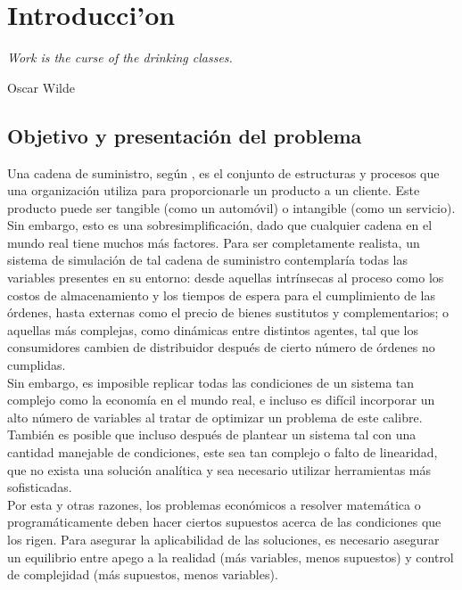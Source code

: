 \chapter{Introducci'on}

\textit{Work is the curse of the drinking classes.}
\begin{flushright}
 Oscar Wilde
 \end{flushright}

\vspace{10 pt}

\section{Objetivo y presentaci\'on del problema}


Una cadena de suministro, seg\'un \citet{Sterman}, es el conjunto de estructuras y procesos que una organizaci\'on utiliza para proporcionarle un producto a un cliente. Este producto puede ser tangible (como un autom\'ovil) o intangible (como un servicio). Sin embargo, esto es una sobresimplificaci\'on, dado que cualquier cadena en el mundo real tiene muchos m\'as factores. Para ser completamente realista, un sistema de simulaci\'on de tal cadena de suministro contemplar\'ia todas las variables presentes en su entorno: desde aquellas intr\'insecas al proceso como los costos de almacenamiento y los tiempos de espera para el cumplimiento de las \'ordenes, hasta externas como el precio de bienes sustitutos y complementarios; o aquellas m\'as complejas, como din\'amicas entre distintos agentes, tal que los consumidores cambien de distribuidor despu\'es de cierto n\'umero de \'ordenes no cumplidas.\\

Sin embargo, es imposible replicar todas las condiciones de un sistema tan complejo como la econom\'ia en el mundo real, e incluso es dif\'icil incorporar un alto n\'umero de variables al tratar de optimizar un problema de este calibre. Tambi\'en es posible que incluso despu\'es de plantear un sistema tal con una cantidad manejable de condiciones, este sea tan complejo o falto de linearidad, que no exista una soluci\'on anal\'itica y sea necesario utilizar herramientas m\'as sofisticadas.\\

Por esta y otras razones, los problemas econ\'omicos a resolver matem\'atica o program\'aticamente deben hacer ciertos supuestos acerca de las condiciones que los rigen. Para asegurar la aplicabilidad de las soluciones, es necesario asegurar un equilibrio entre apego a la realidad (m\'as variables, menos supuestos) y control de complejidad (m\'as supuestos, menos variables).\\

